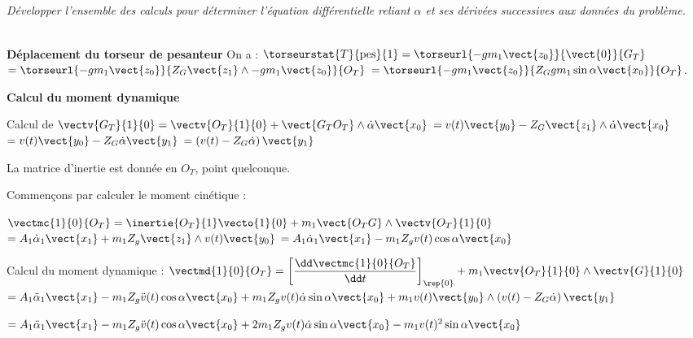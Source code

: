\begin{multicols}{2}
\subparagraph{} \textit{Développer l'ensemble des calculs pour déterminer l'équation différentielle reliant $\alpha$ et ses dérivées
successives aux données du problème.}
\ifprof
\begin{corrige} ~\\

\textbf{Déplacement du torseur de pesanteur}
On a : $\torseurstat{T}{\text{pes}}{1} = \torseurl{-gm_1\vect{z_0}}{\vect{0}}{G_T}$ 
$= \torseurl{-gm_1\vect{z_0}}{Z_G \vect{z_1}\wedge -gm_1\vect{z_0}}{O_T}$
$= \torseurl{-gm_1\vect{z_0}}{Z_G gm_1\sin\alpha \vect{x_0}}{O_T}$.


\textbf{Calcul du moment dynamique} 

Calcul de $\vectv{G_T}{1}{0} =\vectv{O_T}{1}{0} + \vect{G_TO_T} \wedge \dot{\alpha} \vect{x_0}$
$=v(t)\vect{y_0}-Z_G\vect{z_1} \wedge \dot{\alpha}\vect{x_0}$
$=v(t)\vect{y_0}-Z_G \dot{\alpha}\vect{y_1}$
$=\left(v(t)-Z_G \dot{\alpha}\right)\vect{y_1}$


La matrice d'inertie est donnée en $O_T$, point quelconque. 

Commençons par calculer le moment cinétique : 

$\vectmc{1}{0}{O_T} = \inertie{O_T}{1}\vecto{1}{0}+m_1\vect{O_TG} \wedge \vectv{O_T}{1}{0}$
$=A_1\dot{\alpha}_1 \vect{x_1}  + m_1 Z_g\vect{z_1} \wedge v(t) \vect{y_0}$
$=A_1\dot{\alpha}_1 \vect{x_1}  - m_1 Z_g v(t)  \cos \alpha \vect{x_0}$ %


Calcul du moment dynamique :
 $\vectmd{1}{0}{O_T}=\left[\dfrac{\dd \vectmc{1}{0}{O_T}  }{\dd t }\right]_{\rep{0}} + m_1 \vectv{O_T}{1}{0}\wedge \vectv{G}{1}{0}$
$=A_1\ddot{\alpha}_1 \vect{x_1}  - m_1 Z_g \ddot{v}(t)  \cos \alpha \vect{x_0} + m_1 Z_g v(t) \dot{\alpha} \sin \alpha \vect{x_0} + m_1 v(t) \vect{y_0}  \wedge \left(v(t)-Z_G \dot{\alpha}\right)\vect{y_1} $

$=A_1\ddot{\alpha}_1 \vect{x_1}  - m_1 Z_g \ddot{v}(t)  \cos \alpha \vect{x_0} + 2m_1 Z_g v(t) \dot{\alpha} \sin \alpha \vect{x_0} - m_1 v(t)^2 \sin\alpha \vect{x_0}$

%
%
%
%



\end{corrige}
\end{multicols}
